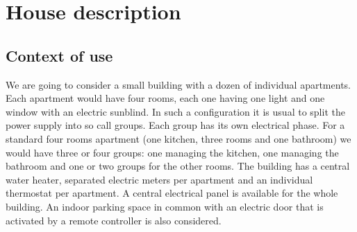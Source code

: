 \documentclass{acm_proc_article-sp}
\begin{document}
\section{House description}
\subsection{Context of use}
We are going to consider a small building with a dozen of individual apartments. 
Each apartment would have four rooms, each one having one light and one window with an electric sunblind. 
In such a configuration it is usual to split the power supply into so call groups. 
Each group has its own electrical phase. 
For a standard four rooms apartment (one kitchen, three rooms and one bathroom) we would have three or four groups: one managing the kitchen, one managing the bathroom and one or two groups for the other rooms. 
The building has a central water heater, separated electric meters per apartment and an individual thermostat per apartment. 
A central electrical panel is available for the whole building. An indoor parking space in common with an electric door that is activated by a remote controller is also considered.
\end{document}

